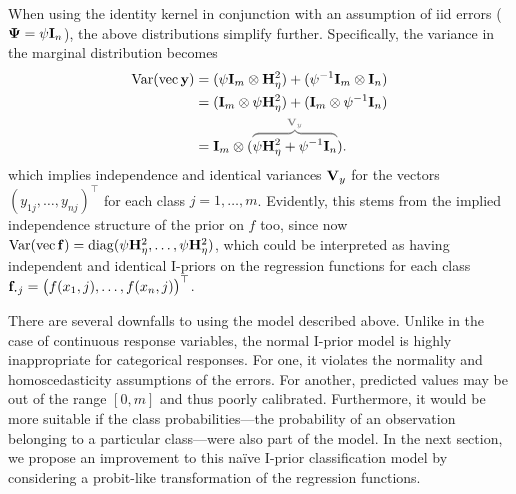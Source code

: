When using the identity kernel in conjunction with an assumption of iid errors (${\bm\Psi} = \psi{\mathbf I}_n$), the above distributions simplify further.
Specifically, the variance in the marginal distribution becomes 
\begin{align*}
  \Var(\vecc \by) 
  &= (\psi\bI_m \otimes \bH_\eta^2) + (\psi^{-1}\bI_m \otimes \bI_n) \\
  &= (\bI_m \otimes \psi\bH_\eta^2) + (\bI_m \otimes \psi^{-1}\bI_n) \\
  &= \bI_m \otimes (\myoverbrace{\psi\bH_\eta^2 + \psi^{-1}\bI_n}{\bV_y}).
\end{align*}
which implies independence and identical variances ${\mathbf V}_y$ for the vectors $(y_{1j},\dots,y_{nj})^\top$ for each class $j=1,\dots,m$.
Evidently, this stems from the implied independence structure of the prior on $f$ too, since now $\operatorname{Var} (\operatorname{vec} {\mathbf f}) = \operatorname{diag}(\psi{\mathbf H}_\eta^2,\dots, \psi{\mathbf H}_\eta^2)$, which could be interpreted as having independent and identical I-priors on the regression functions for each class $\bff_{\bigcdot j} = \big(f(x_1,j),\dots,f(x_n,j)\big)^\top$.

There are several downfalls to using the model described above.
Unlike in the case of continuous response variables, the normal I-prior model is highly inappropriate for categorical responses.
For one, it violates the normality and homoscedasticity assumptions of the errors.
For another, predicted values may be out of the range $[0,m]$ and thus poorly calibrated.
Furthermore, it would be more suitable if the class probabilities---the probability of an observation belonging to a particular class---were also part of the model.
In the next section, we propose an improvement to this naïve I-prior classification model by considering a probit-like transformation of the regression functions.

